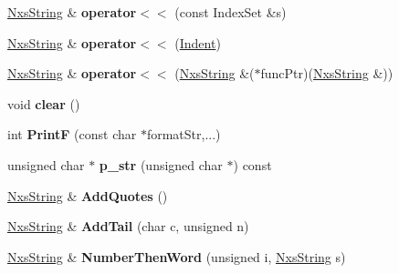 \begin{DoxyCompactItemize}
\item 
\hypertarget{classNxsString_aa958f87c211324454e01fc4fb3c31432}{
\hyperlink{classNxsString}{NxsString} \& {\bfseries operator$<$$<$} (const IndexSet \&s)}
\label{classNxsString_aa958f87c211324454e01fc4fb3c31432}

\item 
\hypertarget{classNxsString_ae713252b6eb56aab58484a0bb07877a0}{
\hyperlink{classNxsString}{NxsString} \& {\bfseries operator$<$$<$} (\hyperlink{classIndent}{Indent})}
\label{classNxsString_ae713252b6eb56aab58484a0bb07877a0}

\item 
\hypertarget{classNxsString_a7d5287ed3070b7f8fc3fdb8348011ff9}{
\hyperlink{classNxsString}{NxsString} \& {\bfseries operator$<$$<$} (\hyperlink{classNxsString}{NxsString} \&($\ast$funcPtr)(\hyperlink{classNxsString}{NxsString} \&))}
\label{classNxsString_a7d5287ed3070b7f8fc3fdb8348011ff9}

\item 
\hypertarget{classNxsString_abbf904c772d9776139dcae602c9fd06b}{
void {\bfseries clear} ()}
\label{classNxsString_abbf904c772d9776139dcae602c9fd06b}

\item 
\hypertarget{classNxsString_aa306462f5efd5859b5b9e51e3cca4b5f}{
int {\bfseries PrintF} (const char $\ast$formatStr,...)}
\label{classNxsString_aa306462f5efd5859b5b9e51e3cca4b5f}

\item 
\hypertarget{classNxsString_a3e1b16d6ff2fdd61ec12fe93bfb8b777}{
unsigned char $\ast$ {\bfseries p\_\-str} (unsigned char $\ast$) const }
\label{classNxsString_a3e1b16d6ff2fdd61ec12fe93bfb8b777}

\item 
\hypertarget{classNxsString_a8a218e1cef0a63b07699392b5dd057b8}{
\hyperlink{classNxsString}{NxsString} \& {\bfseries AddQuotes} ()}
\label{classNxsString_a8a218e1cef0a63b07699392b5dd057b8}

\item 
\hypertarget{classNxsString_aefdfa11e806b213308bdfe88b6ff9467}{
\hyperlink{classNxsString}{NxsString} \& {\bfseries AddTail} (char c, unsigned n)}
\label{classNxsString_aefdfa11e806b213308bdfe88b6ff9467}

\item 
\hypertarget{classNxsString_a09a3670ce5a889ed02f3cc27afa1fc7d}{
\hyperlink{classNxsString}{NxsString} \& {\bfseries NumberThenWord} (unsigned i, \hyperlink{classNxsString}{NxsString} s)}
\label{classNxsString_a09a3670ce5a889ed02f3cc27afa1fc7d}


\end{DoxyCompactItemize}

